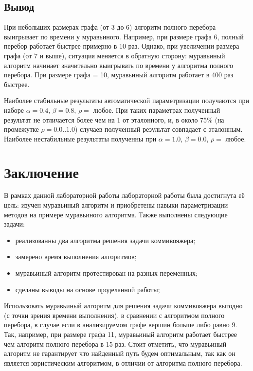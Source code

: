 \documentclass[12pt]{report}
\begin{document}
\section*{Вывод}

При небольших размерах графа (от 3 до 6) алгоритм полного перебора выигрывает по времени у муравьиного. Например, при размере графа 6, полный перебор работает быстрее примерно в 10 раз. Однако, при увеличении размера графа (от 7 и выше), ситуация меняется в обратную сторону: муравьиный алгоритм начинает значительно выигрывать по времени у алгоритма полного перебора. При размере графа = 10, муравьиный алгоритм работает в 400 раз быстрее.

Наиболее стабильные результаты автоматической параметризации получаются при наборе $\alpha = 0.4$, $\beta = 0.8$, $\rho = $ любое. При таких параметрах полученный результат не отличается более чем на 1 от эталонного, и, в около 75\% (на промежутке $\rho = 0.0..1.0$) случаев полученный результат совпадает с эталонным. Наиболее нестабильные результаты полученны при $\alpha = 1.0$, $\beta = 0.0$, $\rho = $ любое.

\chapter*{Заключение}
	
В рамках данной лабораторной работы лабораторной работы была достигнута её цель: изучен муравьиный алгоритм и приобретены навыки параметризации методов на примере муравьиного алгоритма. Также выполнены следующие задачи:
	
\begin{itemize}
	\item реализованны два алгоритма решения задачи коммивояжера;
	\item замерено время выполнения алгоритмов;
	\item муравьиный алгоритм протестирован на разных переменных;
	\item сделаны выводы на основе проделанной работы;
\end{itemize}

Использовать муравьиный алгоритм для решения задачи коммивояжера выгодно (с точки зрения времени выполнения), в сравнении с алгоритмом полного перебора, в случае если в анализируемом графе вершин больше либо равно 9. Так, например, при размере графа 11, муравьиный алгоритм работает быстрее чем алгоритм полного перебора в 15 раз. Стоит отметить, что муравьиный алгоритм не гарантирует что найденный путь будем оптимальным, так как он является эвристическим алгоритмом, в отличии от алгоритма полного перебора.

	
\end{document}
